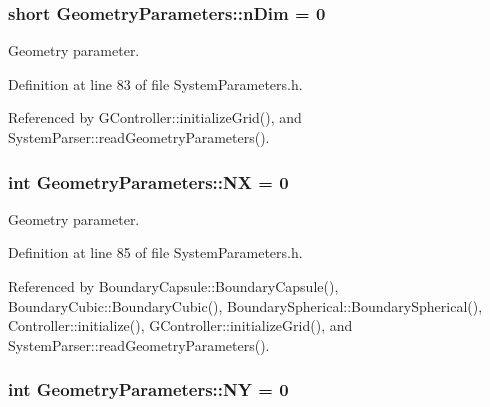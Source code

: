 \hypertarget{structGeometryParameters_aa50b4a0940d8ca9da6f647a1c21d9522}{
\subsubsection[{n\+Dim}]{\setlength{\rightskip}{0pt plus 5cm}short Geometry\+Parameters\+::n\+Dim = 0}}\label{structGeometryParameters_aa50b4a0940d8ca9da6f647a1c21d9522}


Geometry parameter. 



Definition at line 83 of file System\+Parameters.\+h.



Referenced by G\+Controller\+::initialize\+Grid(), and System\+Parser\+::read\+Geometry\+Parameters().

\hypertarget{structGeometryParameters_a45f424cfb62b868a4becc8b0bd0d32bc}{
\subsubsection[{N\+X}]{\setlength{\rightskip}{0pt plus 5cm}int Geometry\+Parameters\+::\+N\+X = 0}}\label{structGeometryParameters_a45f424cfb62b868a4becc8b0bd0d32bc}


Geometry parameter. 



Definition at line 85 of file System\+Parameters.\+h.



Referenced by Boundary\+Capsule\+::\+Boundary\+Capsule(), Boundary\+Cubic\+::\+Boundary\+Cubic(), Boundary\+Spherical\+::\+Boundary\+Spherical(), Controller\+::initialize(), G\+Controller\+::initialize\+Grid(), and System\+Parser\+::read\+Geometry\+Parameters().

\hypertarget{structGeometryParameters_a5c7a33268cbfa1b236fa1bf0ef9bafc7}{
\subsubsection[{N\+Y}]{\setlength{\rightskip}{0pt plus 5cm}int Geometry\+Parameters\+::\+N\+Y = 0}}\label{structGeometryParameters_a5c7a33268cbfa1b236fa1bf0ef9bafc7}



